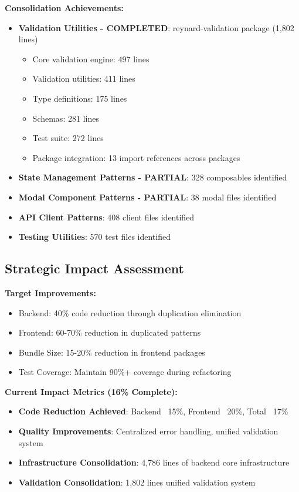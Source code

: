\documentclass[10pt]{article}
\begin{document}
\textbf{Consolidation Achievements:}
\begin{itemize}
    \item \textbf{Validation Utilities - COMPLETED}: reynard-validation package (1,802 lines)
    \begin{itemize}
        \item Core validation engine: 497 lines
        \item Validation utilities: 411 lines
        \item Type definitions: 175 lines
        \item Schemas: 281 lines
        \item Test suite: 272 lines
        \item Package integration: 13 import references across packages
    \end{itemize}
    \item \textbf{State Management Patterns - PARTIAL}: 328 composables identified
    \item \textbf{Modal Component Patterns - PARTIAL}: 38 modal files identified
    \item \textbf{API Client Patterns}: 408 client files identified
    \item \textbf{Testing Utilities}: 570 test files identified
\end{itemize}

\subsection{Strategic Impact Assessment}

\textbf{Target Improvements:}
\begin{itemize}
    \item Backend: 40\% code reduction through duplication elimination
    \item Frontend: 60-70\% reduction in duplicated patterns
    \item Bundle Size: 15-20\% reduction in frontend packages
    \item Test Coverage: Maintain 90\%+ coverage during refactoring
\end{itemize}

\textbf{Current Impact Metrics (16\% Complete):}
\begin{itemize}
    \item \textbf{Code Reduction Achieved}: Backend ~15\%, Frontend ~20\%, Total ~17\%
    \item \textbf{Quality Improvements}: Centralized error handling, unified validation system
    \item \textbf{Infrastructure Consolidation}: 4,786 lines of backend core infrastructure
    \item \textbf{Validation Consolidation}: 1,802 lines unified validation system
\end{itemize}
\end{document}
